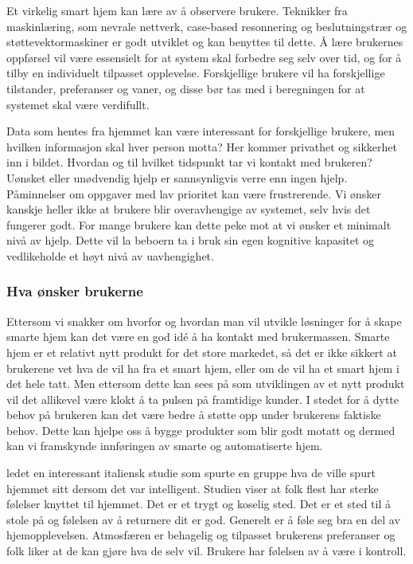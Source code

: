 Et virkelig smart hjem kan lære av å observere brukere. Teknikker fra maskinlæring, som nevrale nettverk, case-based resonnering og beslutningstrær og støttevektormaskiner er godt utviklet og kan benyttes til dette. Å lære brukernes oppførsel vil være essensielt for at system skal forbedre seg selv over tid, og for å tilby en individuelt tilpasset opplevelse. Forskjellige brukere vil ha forskjellige tilstander, preferanser og vaner, og disse bør tas med i beregningen for at systemet skal være verdifullt.

Data som hentes fra hjemmet kan være interessant for forskjellige brukere, men hvilken informasjon skal hver person motta? Her kommer privathet og sikkerhet inn i bildet. Hvordan og til hvilket tidspunkt tar vi kontakt med brukeren? Uønsket eller unødvendig hjelp er sannsynligvis verre enn ingen hjelp. Påminnelser om oppgaver med lav prioritet kan være frustrerende. Vi ønsker kanskje heller ikke at brukere blir overavhengige av systemet, selv hvis det fungerer godt. For mange brukere kan dette peke mot at vi ønsker et minimalt nivå av hjelp. Dette vil la beboern ta i bruk sin egen kognitive kapasitet og vedlikeholde et høyt nivå av uavhengighet. 


\subsubsection*{Hva ønsker brukerne}
Ettersom vi snakker om hvorfor og hvordan man vil utvikle løsninger for å skape smarte hjem kan det være en god idé å ha kontakt med brukermassen. Smarte hjem er et relativt nytt produkt for det store markedet, så det er ikke sikkert at brukerene vet hva de vil ha fra et smart hjem, eller om de vil ha et smart hjem i det hele tatt. Men ettersom dette kan sees på som utviklingen av et nytt produkt vil det allikevel være klokt å ta pulsen på framtidige kunder. I stedet for å dytte behov på brukeren kan det være bedre å støtte opp under brukerens faktiske behov. Dette kan hjelpe oss å bygge produkter som blir godt motatt og dermed kan vi framskynde innføringen av smarte og automatiserte hjem.

\citet{bonino11} ledet en interessant italiensk studie som spurte en gruppe hva de ville spurt hjemmet sitt dersom det var intelligent. Studien viser at folk flest har sterke følelser knyttet til hjemmet. Det er et trygt og koselig sted. Det er et sted til å stole på og følelsen av å returnere dit er god. Generelt er å føle seg bra en del av hjemopplevelsen. Atmosfæren er behagelig og tilpasset brukerens preferanser og folk liker at de kan gjøre hva de selv vil. Brukere har følelsen av å være i kontroll.

